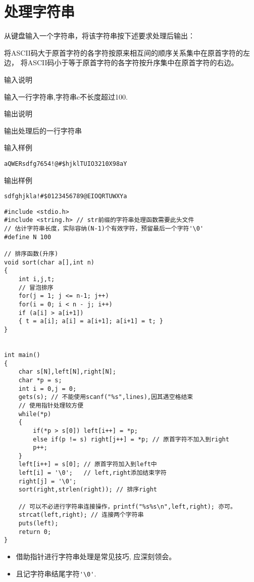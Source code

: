 \section{处理字符串}
从键盘输入一个字符串，将该字符串按下述要求处理后输出： 

将ASCII码大于原首字符的各字符按原来相互间的顺序关系集中在原首字符的左边，
将ASCII码小于等于原首字符的各字符按升序集中在原首字符的右边。

输入说明	

输入一行字符串,字符串c不长度超过100.

输出说明	

输出处理后的一行字符串

输入样例

\lstinline[mathescape=false]|aQWERsdfg7654!@#$hjklTUIO3210X98aY|

输出样例
	
\lstinline[mathescape=false]|sdfghjkla!#$0123456789@EIOQRTUWXYa|


\begin{lstlisting}
#include <stdio.h>
#include <string.h> // str前缀的字符串处理函数需要此头文件
// 估计字符串长度，实际容纳(N-1)个有效字符，预留最后一个字符'\0'  
#define N 100

// 排序函数(升序) 
void sort(char a[],int n)
{ 
	int i,j,t;
	// 冒泡排序
	for(j = 1; j <= n-1; j++) 
	for(i = 0; i < n - j; i++)
	if (a[i] > a[i+1]) 
	{ t = a[i]; a[i] = a[i+1]; a[i+1] = t; }
}


int main()
{
	char s[N],left[N],right[N];
	char *p = s;
	int i = 0,j = 0;
	gets(s); // 不能使用scanf("%s",lines),因其遇空格结束
	// 使用指针处理较方便 
	while(*p)
	{
		if(*p > s[0]) left[i++] = *p;
		else if(p != s) right[j++] = *p; // 原首字符不加入到right 
		p++; 
	}
	left[i++] = s[0]; // 原首字符加入到left中 
	left[i] = '\0';   // left,right添加结束字符 
	right[j] = '\0';
	sort(right,strlen(right)); // 排序right 
	
	// 可以不必进行字符串连接操作，printf("%s%s\n",left,right); 亦可。
	strcat(left,right); // 连接两个字符串 
	puts(left);
	return 0;
} 
\end{lstlisting}

\begin{note}[要点]
	\begin{itemize}
		\item 借助指针进行字符串处理是常见技巧, 应深刻领会。
		\item 且记字符串结尾字符\lstinline|'\0'|.
	\end{itemize}
\end{note}
